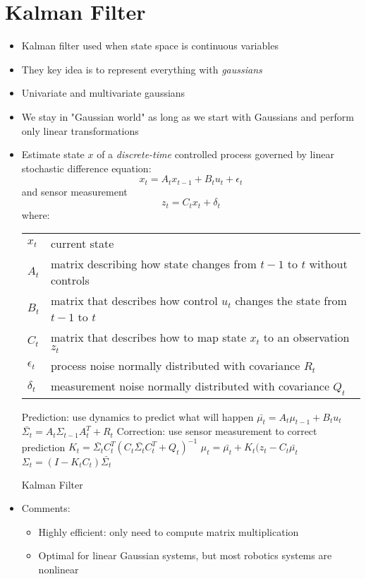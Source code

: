 \documentclass[../main.tex]{subfiles}
\makeatletter
\newenvironment{conditions}
  {\\ \vspace{\abovedisplayskip}\noindent\begin{tabular}{>{$}l<{$} @{${}={}$} l}}
  {\end{tabular}\par\vspace{\belowdisplayskip}}
\makeatother
\begin{document}
\section{Kalman Filter}
  \begin{itemize}
      \item Kalman filter used when state space is continuous variables
      \item They key idea is to represent everything with \textit{gaussians}
      \item Univariate and multivariate gaussians
      \item We stay in "Gaussian world" as long as we start with Gaussians and perform only linear transformations
      \item Estimate state $x$ of a \textit{discrete-time} controlled process governed by linear stochastic difference equation:
      \begin{equation*}
        x_{t} = A_{t}x_{t-1} + B_{t}u_{t} + \epsilon_{t}
      \end{equation*}
      and sensor measurement
      \begin{equation*}
        z_{t} = C_{t}x_{t} + \delta_{t}
      \end{equation*}
      where:
      \begin{conditions}
        x_{t} & current state \\
        A_{t} & matrix describing how state changes from $t-1$ to $t$ without controls \\
        B_{t} & matrix that describes how control $u_{t}$ changes the state from $t-1$ to
        $t$ \\
        C_{t} & matrix that describes how to map state $x_{t}$ to an observation $z_{t}$ \\
        \epsilon_{t} & process noise normally distributed with covariance $R_{t}$ \\
        \delta_{t} & measurement noise normally distributed with covariance $Q_{t}$ \\
      \end{conditions}
      \begin{algorithm}[H]
          \SetAlgoLined
          Prediction: use dynamics to predict what will happen\;
          $\bar{\mu_{t}} = A_{t}\mu_{t-1} + B_{t}u_{t}$\;
          $\bar{\Sigma_{t}} = A_{t}\Sigma_{t-1}A_{t}^{T} + R_{t}$\;
          Correction: use sensor measurement to correct prediction\;
          $K_{t} = \bar{\Sigma_{t}}C_{t}^{T}(C_{t}\bar{\Sigma_{t}}C_{t}^{T} + Q_{t})^{-1}$\;
          $\mu_{t} = \bar{\mu_{t}} + K_{t}(z_{t} - C_{t}\bar{\mu_{t}}$\;
          $\Sigma_{t} = (I - K_{t}C_{t})\bar{\Sigma_{t}}$\;
          \caption{Kalman Filter}
      \end{algorithm}
      \item Comments:
        \begin{itemize}
            \item Highly efficient: only need to compute matrix multiplication
            \item Optimal for linear Gaussian systems, but most robotics systems are nonlinear
        \end{itemize}
  \end{itemize}
\end{document}
